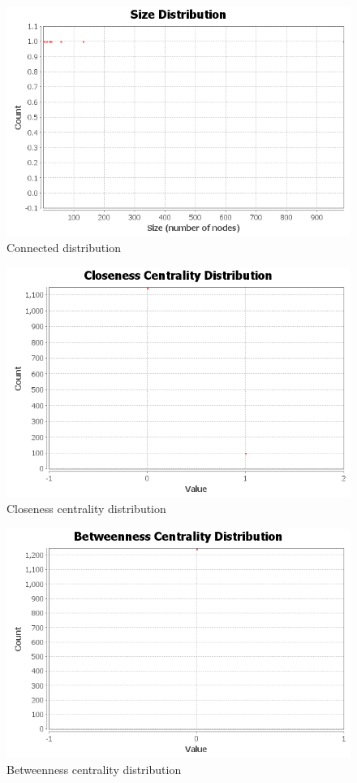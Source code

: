 \documentclass{article}
\begin{document}
\graphicspath{{q3/connected/}}
\begin{figure}
  \centering
  \caption{Connected distribution}
  \includegraphics[scale=.5]{cc-size-distribution.png}
\end{figure}
\graphicspath{{q3/diameter/}}
\begin{figure}
  \centering
  \caption{Closeness centrality distribution}
  \includegraphics[scale=.5]{ClosenessCentralityDistribution.png}
\end{figure}
\begin{figure}
  \centering
  \caption{Betweenness centrality distribution}
  \includegraphics[scale=.5]{BetweennessCentralityDistribution.png}
\end{figure}
\end{document}
